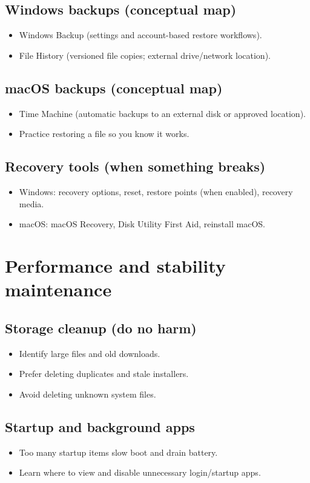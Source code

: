\subsection{Windows backups (conceptual map)}
\begin{itemize}
\item Windows Backup (settings and account-based restore workflows).
\item File History (versioned file copies; external drive/network location).
\end{itemize}

\subsection{macOS backups (conceptual map)}
\begin{itemize}
\item Time Machine (automatic backups to an external disk or approved location).
\item Practice restoring a file so you know it works.
\end{itemize}

\subsection{Recovery tools (when something breaks)}
\begin{itemize}
\item Windows: recovery options, reset, restore points (when enabled), recovery media.
\item macOS: macOS Recovery, Disk Utility First Aid, reinstall macOS.
\end{itemize}

\section{Performance and stability maintenance}
\subsection{Storage cleanup (do no harm)}
\begin{itemize}
\item Identify large files and old downloads.
\item Prefer deleting duplicates and stale installers.
\item Avoid deleting unknown system files.
\end{itemize}

\subsection{Startup and background apps}
\begin{itemize}
\item Too many startup items slow boot and drain battery.
\item Learn where to view and disable unnecessary login/startup apps.
\end{itemize}

